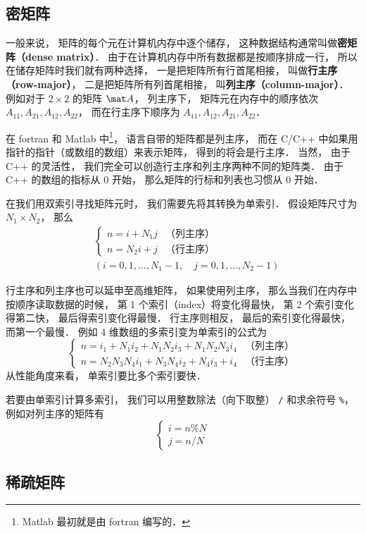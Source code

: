 
\begin{issues}
\issueTODO
\end{issues}

\subsection{密矩阵}
一般来说， 矩阵的每个元在计算机内存中逐个储存， 这种数据结构通常叫做\textbf{密矩阵（dense matrix）}． 由于在计算机内存中所有数据都是按顺序排成一行， 所以在储存矩阵时我们就有两种选择， 一是把矩阵所有行首尾相接， 叫做\textbf{行主序（row-major）}， 二是把矩阵所有列首尾相接， 叫\textbf{列主序（column-major）}． 例如对于 $2 \times 2$ 的矩阵 $\mat A$， 列主序下， 矩阵元在内存中的顺序依次 $A_{11}, A_{21}, A_{12}, A_{22}$， 而在行主序下顺序为 $A_{11},A_{12},A_{21},A_{22}$．

在 fortran 和 Matlab 中\footnote{Matlab 最初就是由 fortran 编写的．}， 语言自带的矩阵都是列主序， 而在 C/C++ 中如果用指针的指针（或数组的数组）来表示矩阵， 得到的将会是行主序． 当然， 由于 C++ 的灵活性， 我们完全可以创造行主序和列主序两种不同的矩阵类． 由于 C++ 的数组的指标从 0 开始， 那么矩阵的行标和列表也习惯从 0 开始．

在我们用双索引寻找矩阵元时， 我们需要先将其转换为单索引． 假设矩阵尺寸为 $N_1 \times N_2$， 那么
\begin{equation}
\begin{aligned}
&\begin{cases}
n = i + N_1 j  &\text{（列主序）}\\
n = N_2 i + j  &\text{（行主序）}
\end{cases}\\
&(i = 0, 1, \dots, N_1-1,\quad j = 0, 1, \dots, N_2-1)
\end{aligned}
\end{equation}

行主序和列主序也可以延申至高维矩阵， 如果使用列主序， 那么当我们在内存中按顺序读取数据的时候， 第 1 个索引（index）将变化得最快， 第 2 个索引变化得第二快， 最后得索引变化得最慢． 行主序则相反， 最后的索引变化得最快， 而第一个最慢． 例如 4 维数组的多索引变为单索引的公式为
\begin{equation}
\begin{cases}
n = i_1 + N_1 i_2 + N_1 N_2 i_3 + N_1 N_2 N_3 i_4  &\text{（列主序）}\\
n = N_2 N_3 N_4 i_1 + N_3 N_4 i_2 + N_4 i_3 + i_4  &\text{（行主序）}
\end{cases}
\end{equation}
从性能角度来看， 单索引要比多个索引要快．

若要由单索引计算多索引， 我们可以用整数除法（向下取整） \verb|/| 和求余符号 \verb|%|， 例如对列主序的矩阵有
\begin{equation}
\begin{cases}
i = n \% N\\
j = n / N
\end{cases}
\end{equation}

\subsection{稀疏矩阵}
